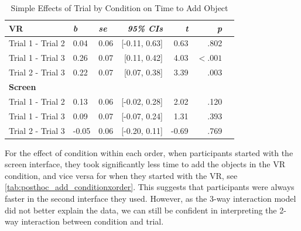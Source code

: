 \documentclass[letterpaper, 10 pt, conference]{ieeeconf}  %
\begin{document}
            \begin{table}[h!]
            \caption{Simple Effects of Trial by Condition on Time to Add Object}
            \centering
            \footnotesize
            \label{tab:posthoc_add_trialxcondition}
            \begin{tabular}{lllrrrr}
              \toprule
               \textbf{VR} &  \textit{b} & \textit{se} & \textit{95\% CIs} &\textit{t} & \textit{p} \\ 
              \midrule
               Trial 1 - Trial 2 & 0.04 & 0.06  & [-0.11, 0.63] & 0.63 & .802 \\
               Trial 1 - Trial 3 & 0.26 & 0.07  & [0.11, 0.42] & 4.03 & $<.001$ \\  
               Trial 2 - Trial 3 & 0.22 & 0.07 & [0.07, 0.38] & 3.39 & .003 \\  \midrule
                 \multicolumn{4}{l}{\textbf{Screen}} \\ \midrule
               Trial 1 - Trial 2 & 0.13 & 0.06  & [-0.02, 0.28] & 2.02 & .120 \\
               Trial 1 - Trial 3 & 0.09 & 0.07  & [-0.07, 0.24] & 1.31 & .393 \\  
               Trial 2 - Trial 3 & -0.05 & 0.06 & [-0.20, 0.11] & -0.69 & .769 \\  
               \bottomrule
            \end{tabular}
            \end{table}


For the effect of condition within each order, when participants started with the screen interface, they took significantly less time to add the objects in the VR condition, and vice versa for when they started with the VR, see \cref{tab:posthoc_add_conditionxorder}. This suggests that participants were always faster in the second interface they used. However, as the 3-way interaction model did not better explain the data, we can still be confident in interpreting the 2-way interaction between condition and trial.  
\end{document}
